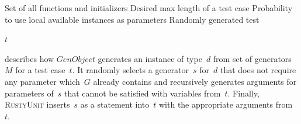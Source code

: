 \documentclass[paper=a4,%
  twoside,%
  BCOR4mm,%
  abstract=true,%
  toc=bibliography,%
  chapterprefix=true,%
  toc=bibliographynumbered,%
  open=right,%
  english,%
  pagesize=pdftex]{scrreprt}
\newcommand{\Desc}[2]{\State \makebox[2em][l]{#1}#2}
\newcommand{\tech}{\textsc{RustyUnit}\xspace}
\begin{document}
\begin{algorithm}[t]
\caption{$GenTest(M, l, p_{local})$}\label{alg:gentest}
\begin{algorithmic}
\Input
  \Desc{$M$}{Set of all functions and initializers}
  \Desc{$l$}{Desired max length of a test case}
  \Desc{$p_{local~}$}{Probability to use local available instances as parameters}
\EndInput
\Output
  \Desc{$t$}{Randomly generated test}
\EndOutput
{}

\EndFor
{}

    \EndIf
  \EndFor
\EndWhile
\State \Return $t$
\end{algorithmic}
\end{algorithm}

 describes how $GenObject$ generates an instance of type~$d$ from set of generators~$M$ for a test case~$t$. It randomly selects a generator~$s$ for~$d$ that does not require any parameter which~$G$ already contains and recursively generates arguments for parameters of~$s$ that cannot be satisfied with variables from~$t$. Finally, \tech inserts~$s$ as a statement into~$t$ with the appropriate arguments from~$t$.
\end{document}
